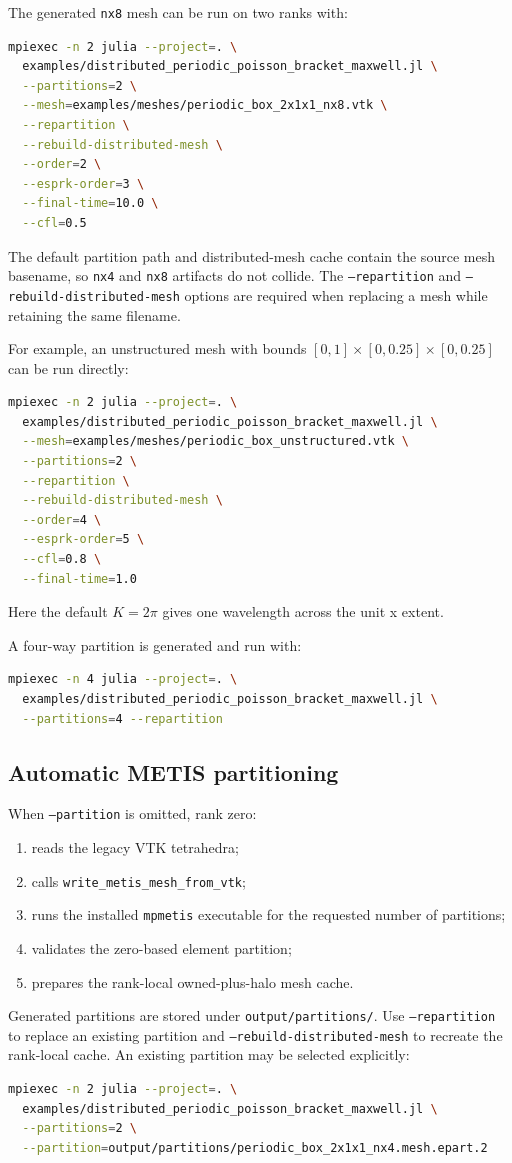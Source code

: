 \documentclass[11pt,oneside]{book}
\newcommand{\code}[1]{\texttt{#1}}
\begin{document}
The generated \code{nx8} mesh can be run on two ranks with:
\begin{lstlisting}[language=bash]
mpiexec -n 2 julia --project=. \
  examples/distributed_periodic_poisson_bracket_maxwell.jl \
  --partitions=2 \
  --mesh=examples/meshes/periodic_box_2x1x1_nx8.vtk \
  --repartition \
  --rebuild-distributed-mesh \
  --order=2 \
  --esprk-order=3 \
  --final-time=10.0 \
  --cfl=0.5
\end{lstlisting}
The default partition path and distributed-mesh cache contain the source mesh
basename, so \code{nx4} and \code{nx8} artifacts do not collide. The
\code{--repartition} and \code{--rebuild-distributed-mesh} options are
required when replacing a mesh while retaining the same filename.

For example, an unstructured mesh with bounds
$[0,1]\times[0,0.25]\times[0,0.25]$ can be run directly:
\begin{lstlisting}[language=bash]
mpiexec -n 2 julia --project=. \
  examples/distributed_periodic_poisson_bracket_maxwell.jl \
  --mesh=examples/meshes/periodic_box_unstructured.vtk \
  --partitions=2 \
  --repartition \
  --rebuild-distributed-mesh \
  --order=4 \
  --esprk-order=5 \
  --cfl=0.8 \
  --final-time=1.0
\end{lstlisting}
Here the default $K=2\pi$ gives one wavelength across the unit x extent.

A four-way partition is generated and run with:
\begin{lstlisting}[language=bash]
mpiexec -n 4 julia --project=. \
  examples/distributed_periodic_poisson_bracket_maxwell.jl \
  --partitions=4 --repartition
\end{lstlisting}

\subsection{Automatic METIS partitioning}

When \code{--partition} is omitted, rank zero:
\begin{enumerate}[leftmargin=*]
  \item reads the legacy VTK tetrahedra;
  \item calls \code{write\_metis\_mesh\_from\_vtk};
  \item runs the installed \code{mpmetis} executable for the requested number
        of partitions;
  \item validates the zero-based element partition;
  \item prepares the rank-local owned-plus-halo mesh cache.
\end{enumerate}
Generated partitions are stored under \code{output/partitions/}. Use
\code{--repartition} to replace an existing partition and
\code{--rebuild-distributed-mesh} to recreate the rank-local cache. An
existing partition may be selected explicitly:
\begin{lstlisting}[language=bash]
mpiexec -n 2 julia --project=. \
  examples/distributed_periodic_poisson_bracket_maxwell.jl \
  --partitions=2 \
  --partition=output/partitions/periodic_box_2x1x1_nx4.mesh.epart.2
\end{lstlisting}
\end{document}
